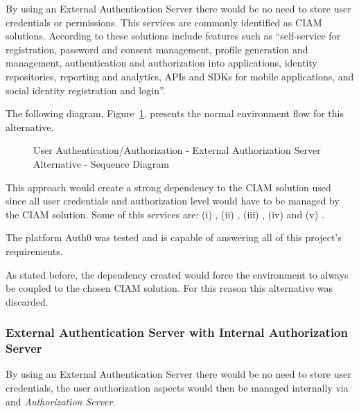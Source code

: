 By using an External Authentication Server there would be no need to store user credentials or permissions. This services are commonly identified as \gls{CIAM} solutions. According to \cite{ciam} these solutions include features such as ``self-service for registration, password and consent management, profile generation and management, authentication and authorization into applications, identity repositories, reporting and analytics, APIs and SDKs for mobile applications, and social identity registration and login''.

The following diagram, Figure~\ref{fig:design:alternatives:auth:externalauth:diagram}, presents the normal environment flow for this alternative.

\begin{figure}[H]
   \centering
   \resizebox{\columnwidth}{!}
   {
      
   }
   \caption[User Authentication/Authorization - External Authorization Server Alternative - Sequence Diagram]{User Authentication/Authorization - External Authorization Server Alternative - Sequence Diagram}
   \label{fig:design:alternatives:auth:externalauth:diagram}
\end{figure}

This approach would create a strong dependency to the \gls{CIAM} solution used since all user credentials and authorization level would have to be managed by the \gls{CIAM} solution.
Some of this services are: (i) , (ii) , (iii) , (iv)  and (v) .

The platform Auth0 was tested and is capable of answering all of this project's requirements.

As stated before, the dependency created would force the environment to always be coupled to the chosen \gls{CIAM} solution. For this reason this alternative was discarded.

\subsubsection{External Authentication Server with Internal Authorization Server}
\label{subsubsec:design:alternatives:auth:externalauthinternalpermission}

By using an External Authentication Server there would be no need to store user credentials, the user authorization aspects would then be managed internally via and \textit{Authorization Server}.

